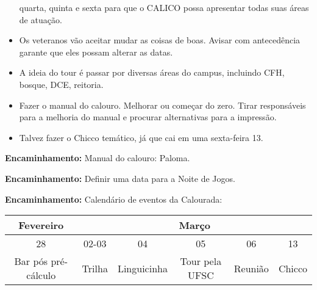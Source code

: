 \documentclass{ata-calico}
\begin{document}
\begin{itemize}
  quarta, quinta e sexta para que o CALICO possa apresentar todas suas áreas de
  atuação.
\item Os veteranos vão aceitar mudar as coisas de boas. Avisar com antecedência garante que eles possam alterar as datas.
\item A ideia do tour é passar por diversas áreas do campus, incluindo CFH, bosque,
  DCE, reitoria.
\item Fazer o manual do calouro. Melhorar ou começar do zero. Tirar responsáveis para a melhoria do manual e procurar alternativas para a
  impressão.
\item Talvez fazer o Chicco temático, já que cai em uma sexta-feira 13.
\end{itemize}

\textbf{Encaminhamento:} Manual do calouro: Paloma.

\textbf{Encaminhamento:} Definir uma data para a Noite de Jogos.

\textbf{Encaminhamento:} Calendário de eventos da Calourada:
\begin{center}
\begin{tabular}{|c|c|c|c|c|c|} \hline
     Fevereiro & \multicolumn{5}{|c|}{Março} \\ \hline
     28 & 02-03 & 04 & 05 & 06 & 13 \\ \hline
     Bar pós pré-cálculo & Trilha & Linguicinha & Tour pela UFSC & Reunião & Chicco \\ \hline
\end{tabular}
\end{center}
\end{document}
